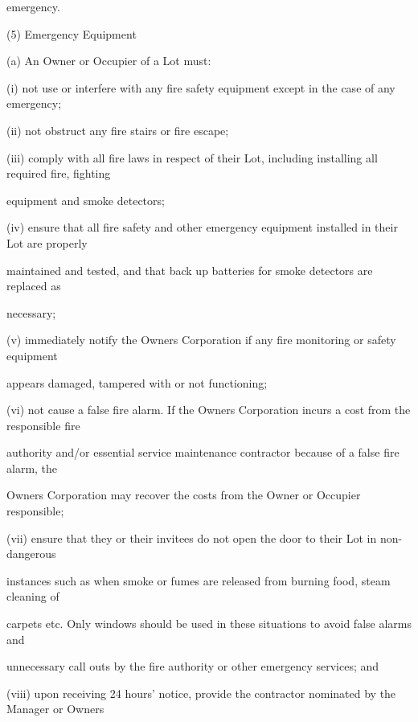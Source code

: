 \documentclass{article}
\begin{document}
{\fontsize{10.02}{1}emergency. }

{\fontsize{9.962}{1}(5) Emergency Equipment }

{\fontsize{9.962}{1}(a) An Owner or Occupier of a Lot must: }

{\fontsize{9.962}{1}(i) not use or interfere with any fire safety equipment except in the case of any emergency; }

{\fontsize{9.962}{1}(ii) not obstruct any fire stairs or fire escape; }

{\fontsize{9.962}{1}(iii) comply with all fire laws in respect of their Lot, including installing all required fire, fighting }

{\fontsize{10.02}{1}equipment and smoke detectors; }

\newpage

{\fontsize{9.962}{1}(iv) ensure that all fire safety and other emergency equipment installed in their Lot are properly }

{\fontsize{10.02}{1}maintained and tested, and that back up batteries for smoke detectors are replaced as }

{\fontsize{10.02}{1}necessary; }

{\fontsize{9.962}{1}(v) immediately notify the Owners Corporation if any fire monitoring or safety equipment }

{\fontsize{10.02}{1}appears damaged, tampered with or not functioning; }

{\fontsize{9.962}{1}(vi) not cause a false fire alarm. If the Owners Corporation incurs a cost from the responsible fire }

{\fontsize{10.02}{1}authority and/or essential service maintenance contractor because of a false fire alarm, the }

{\fontsize{10.02}{1}Owners Corporation may recover the costs from the Owner or Occupier responsible; }

{\fontsize{9.962}{1}(vii) ensure that they or their invitees do not open the door to their Lot in non-dangerous }

{\fontsize{10.02}{1}instances such as when smoke or fumes are released from burning food, steam cleaning of }

{\fontsize{10.02}{1}carpets etc. Only windows should be used in these situations to avoid false alarms and }

{\fontsize{10.02}{1}unnecessary call outs by the fire authority or other emergency services; and }

{\fontsize{9.962}{1}(viii) upon receiving 24 hours’ notice, provide the contractor nominated by the Manager or Owners }
\end{document}
